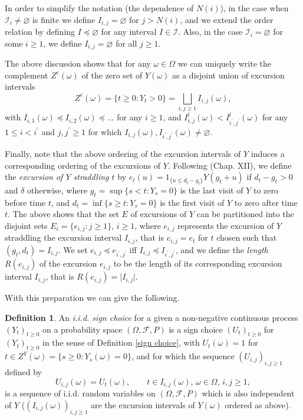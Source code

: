 \documentclass[reqno]{amsart}
\theoremstyle{definition}
\newtheorem{definition}[theorem]{Definition}
\theoremstyle{remark}
\numberwithin{equation}{section}
\begin{document}
In order to simplify the notation (the dependence of $N(i)$), in the case when $\mathcal{I}_i\neq \varnothing$ is finite we define $I_{i,j}=\varnothing$ for $j>N(i)$, and we extend the order relation by defining $I\preceq \varnothing$ for any interval $I\in \mathcal{I}$. Also, in the case $\mathcal{I}_i=\varnothing$ for some $i\geq 1$, we define $I_{i,j}=\varnothing$ for all $j\geq 1$.

The above discussion shows that for any $\omega\in \Omega$ we can uniquely write the complement ${Z}^c (\omega)$ of the zero set of $Y(\omega)$ as a disjoint union of excursion intervals
\begin{equation} \label{ordered excursions}
{Z}^c(\omega)=\{t\geq 0:Y_t>0\}=\bigsqcup_{i,j\geq 1} I_{i,j}(\omega),
\end{equation}
with $I_{i,1}(\omega) \preceq I_{i,2}(\omega) \preceq \ldots$ for any $i\geq 1$, and $I_{i,j}^l(\omega) < I_{i^\prime,j^\prime}^l(\omega)$ for any $1\leq i< i^\prime$ and $j,j^\prime \geq 1$ for which $I_{i,j}(\omega),I_{i^\prime,j^\prime}(\omega)\neq\varnothing$.

Finally, note that the above ordering of the excursion intervals of $Y$ induces a corresponding ordering of the excursions of $Y$. Following \cite{Revuz and Yor} (Chap. XII), we define the \emph{excursion of $Y$ straddling $t$} by $e_t(u)=1_{\{u\leq d_t-g_t\}} Y(g_t+u)$ if $d_t-g_t>0$ and $\delta$ otherwise, where $g_t=\sup\{s < t: Y_s=0\}$ is the last visit of $Y$ to zero before time $t$, and $d_t=\inf \{s\ge t: Y_s=0\}$ is the first visit of $Y$ to zero after time $t$. The above shows that the set $E$ of excursions of $Y$ can be partitioned into the disjoint sets $E_i=\{e_{i,j}:j\geq 1\}$, $i\geq 1$, where $e_{i,j}$ represents the excursion of $Y$ straddling the excursion interval $I_{i,j}$, that is $e_{i,j}=e_t$ for $t$ chosen such that $(g_t,d_t)=I_{i,j}$. We set $e_{i,j}\preceq e_{i^\prime,j^\prime}$ iff $I_{i,j}\preceq I_{i^\prime,j^\prime}$, and we define the \emph{length} $R(e_{i,j})$ of the excursion $e_{i,j}$ to be the length of its corresponding excursion interval $I_{i,j}$, that is $R(e_{i,j})=\vert I_{i,j}\vert$.

With this preparation we can give the following.

\begin{definition}\label{iid sign choice}
An \emph{i.i.d. sign choice} for a given a non-negative continuous process $\left(Y_{t}\right) _{t\geq 0}$ on a probability space $(\Omega, \mathcal{F}, P)$ is a sign choice $\left( U_{t}\right) _{t\geq 0}$ for $(Y_t)_{t\ge 0}$ in the sense of Definition \ref{sign choice}, with $U_t(\omega)=1$ for $t\in Z^Y(\omega)=\{s\ge 0: Y_s(\omega)=0\}$, and for which the sequence $(U_{i,j})_{i,j\geq 1}$ defined by
\begin{equation}\label{construction of iid sign choice}
U_{i,j}(\omega)= U_t(\omega),\qquad t\in I_{i,j}(\omega), \, \omega\in\Omega, \, i,j\ge 1,
\end{equation}
is a sequence of i.i.d. random variables on $(\Omega, \mathcal{F}, P)$ which is also independent of $Y$ ($(I_{i,j}(\omega))_{i,j\geq 1}$ are the excursion intervals of $Y(\omega)$ ordered as above).
\end{definition}
\end{document}
